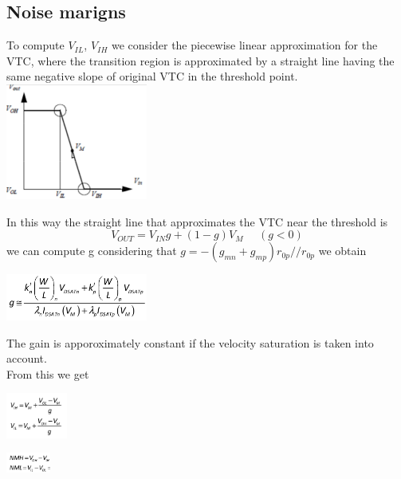 \subsection{Noise marigns}

To compute $V_{IL}$, $V_{IH}$ we consider the piecewise linear approximation for the VTC, where the transition region is approximated by a straight line having the same negative slope of original VTC in the threshold point.\\

\centering
\includegraphics[width=0.35\textwidth]{C3_6.png}\\
\raggedright

In this way the straight line that approximates the VTC near the threshold is 
\begin{equation}
V_{OUT}=V_{IN}g+(1-g)V_M \ \ \ \ \ \ (g<0)
\end{equation}
we can compute g considering that $g=-(g_{mn}+g_{mp})r_{0p}//r_{0p}$ we obtain

\vspace{2.5mm}

\centering
\includegraphics[width=0.35\textwidth]{C3_7.png}\\
\raggedright

\vspace{2.5mm}

The gain is apporoximately constant if the velocity saturation is taken into account.\\

From this we get 

\centering
\includegraphics[width=0.15\textwidth]{C3_8.png}\\
\raggedright

\centering
\includegraphics[width=0.11\textwidth]{C3_9.png}\\
\raggedright


